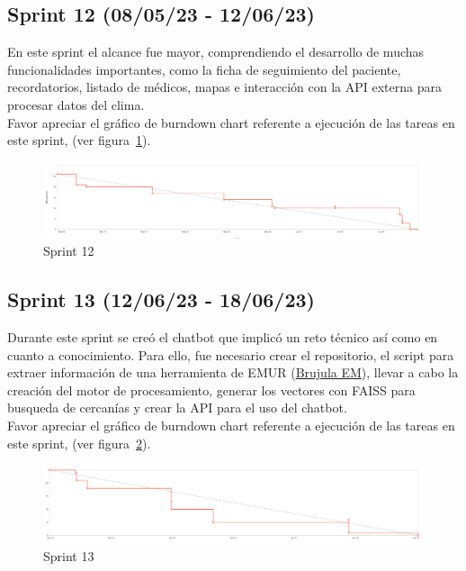 \subsection{Sprint 12 (08/05/23 - 12/06/23)}\label{sprint-0-250423---080523}
En este sprint el alcance fue mayor, comprendiendo el desarrollo de muchas funcionalidades importantes, como la ficha de seguimiento del paciente, recordatorios, listado de médicos, mapas e interacción con la API externa para procesar datos del clima. \\
Favor apreciar el gráfico de burndown chart referente a ejecución de las tareas en este sprint, (ver figura~\ref{Img:Sprint+12}).
\begin{figure}[h]
    \centering
    \includegraphics[width=1.0\textwidth]{img/sprint/sprint12.png}
    \caption{Sprint 12} \label{Img:Sprint+12}
\end{figure} 
\newpage
\subsection{Sprint 13 (12/06/23 - 18/06/23)}\label{sprint-0-120623---180623}
Durante este sprint se creó el chatbot que implicó un reto técnico así como en cuanto a conocimiento. Para ello, fue necesario crear el repositorio, el script para extraer información de una herramienta de EMUR (\href{https://brujulaem.uy/sitio/}{Brujula EM}), llevar a cabo la creación del motor de procesamiento, generar los vectores con FAISS para busqueda de cercanías y crear la API para el uso del chatbot.\\
Favor apreciar el gráfico de burndown chart referente a ejecución de las tareas en este sprint, (ver figura~\ref{Img:Sprint+13}).
\begin{figure}[h]
    \centering
    \includegraphics[width=1.0\textwidth]{img/sprint/sprint13.png}
    \caption{Sprint 13} \label{Img:Sprint+13}
\end{figure} 

